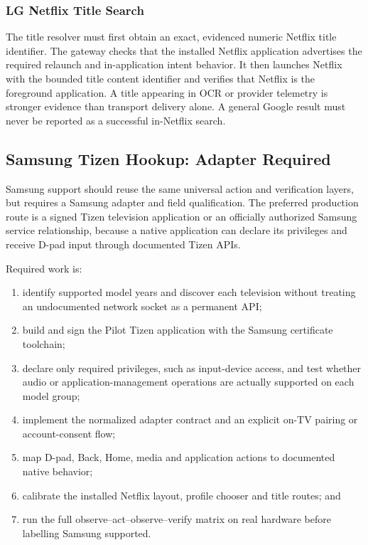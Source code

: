 \subsubsection{LG Netflix Title Search}

The title resolver must first obtain an exact, evidenced numeric Netflix title
identifier. The gateway checks that the installed Netflix application advertises
the required relaunch and in-application intent behavior. It then launches
Netflix with the bounded title content identifier and verifies that Netflix is
the foreground application. A title appearing in OCR or provider telemetry is
stronger evidence than transport delivery alone. A general Google result must
never be reported as a successful in-Netflix search.

\subsection{Samsung Tizen Hookup: Adapter Required}

Samsung support should reuse the same universal action and verification layers,
but requires a Samsung adapter and field qualification. The preferred production
route is a signed Tizen television application or an officially authorized
Samsung service relationship, because a native application can declare its
privileges and receive D-pad input through documented Tizen APIs.

Required work is:

\begin{enumerate}
  \item identify supported model years and discover each television without
        treating an undocumented network socket as a permanent API;
  \item build and sign the Pilot Tizen application with the Samsung certificate
        toolchain;
  \item declare only required privileges, such as input-device access, and test
        whether audio or application-management operations are actually supported
        on each model group;
  \item implement the normalized adapter contract and an explicit on-TV pairing
        or account-consent flow;
  \item map D-pad, Back, Home, media and application actions to documented native
        behavior;
  \item calibrate the installed Netflix layout, profile chooser and title routes;
        and
  \item run the full observe--act--observe--verify matrix on real hardware before
        labelling Samsung supported.
\end{enumerate}

